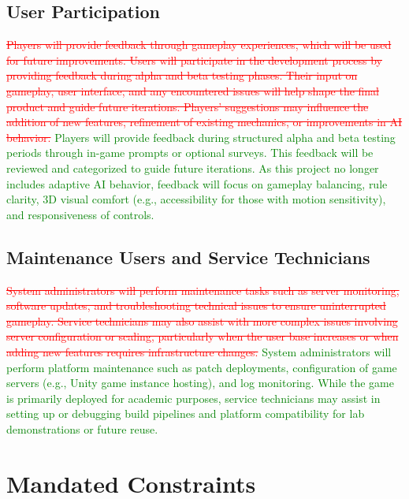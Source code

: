 \documentclass[12pt]{article}
\newcommand{\removed}[1]{\textcolor{red}{\sout{#1}}}
\newcommand{\added}[1]{\textcolor{green}{#1}}
\begin{document}
\subsection{User Participation}
\removed{Players will provide feedback through gameplay experiences, which will be used for future improvements. Users will participate in the development process by providing feedback during alpha and beta testing phases. Their input on gameplay, user interface, and any encountered issues will help shape the final product and guide future iterations. Players’ suggestions may influence the addition of new features, refinement of existing mechanics, or improvements in AI behavior.}
\added{Players will provide feedback during structured alpha and beta testing periods through in-game prompts or optional surveys. This feedback will be reviewed and categorized to guide future iterations. As this project no longer includes adaptive AI behavior, feedback will focus on gameplay balancing, rule clarity, 3D visual comfort (e.g., accessibility for those with motion sensitivity), and responsiveness of controls.}

\subsection{Maintenance Users and Service Technicians}
\removed{System administrators will perform maintenance tasks such as server monitoring, software updates, and troubleshooting technical issues to ensure uninterrupted gameplay. Service technicians may also assist with more complex issues involving server configuration or scaling, particularly when the user base increases or when adding new features requires infrastructure changes.}
\added{System administrators will perform platform maintenance such as patch deployments, configuration of game servers (e.g., Unity game instance hosting), and log monitoring. While the game is primarily deployed for academic purposes, service technicians may assist in setting up or debugging build pipelines and platform compatibility for lab demonstrations or future reuse.}

\section{Mandated Constraints}
\end{document}
